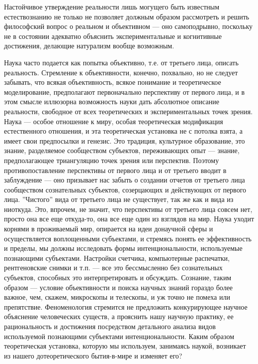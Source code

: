 \documentclass[11pt]{book}
\begin{document}
Настойчивое утверждение реальности лишь могущего быть известным естествознанию не только не позволяет должным образом рассмотреть и решить философский вопрос о реальном и объективном --- оно самоподрывно, поскольку не в состоянии адекватно объяснить экспериментальные и когнитивные достижения, делающие натурализм вообще возможным.

Наука часто подается как попытка объективно, т.е. от третьего лица, описать реальность. Стремление к объективности, конечно, похвально, но не следует забывать, что всякая объективность, всякое понимание и теоретическое моделирование, предполагают первоначально перспективу от первого лица, и в этом смысле иллюзорна возможность науки дать абсолютное описание реальности, свободное от всех теоретических и экспериментальных точек зрения. Наука --- особое отношение к миру, особая теоретическая модификация естественного отношения, и эта теоретическая установка не с потолка взята, а имеет свои предпосылки и генезис. Это традиция, культурное образование, это знание, разделяемое сообществом субъектов, переживающих опыт --- знание, предполагающее триангуляцию точек зрения или перспектив. Поэтому противопоставление перспективы от первого лица и от третьего вводит в заблуждение --- оно призывает нас забыть о создании отчетов от третьего лица сообществом сознательных субъектов, созерцающих и действующих от первого лица. ''Чистого'' вида от третьего лица не существует, так же как и вида из ниоткуда. Это, впрочем, не значит, что перспективы от третьего лица совсем нет, просто она все еще откуда-то, она все еще один из взглядов на мир. Наука уходит корнями в проживаемый мир, опирается на идеи донаучной сферы и осуществляется воплощенными субъектами, и стремясь понять ее эффективность и пределы, мы должны исследовать формы интенциональности, используемые познающими субъектами. Настройки счетчика, компьютерные распечатки, рентгеновские снимки и т.п. --- все это бессмысленно без сознательных субъектов, способных это интерпретировать и обсуждать. Сознание, таким образом --- условие объективности и поиска научных знаний гораздо более важное, чем, скажем, микроскопы и телескопы, и уж точно не помеха или препятствие. Феноменология стремится не предложить конкурирующее научное объяснение человеческих существ, а прояснить нашу научную практику, ее рациональность и достижения посредством детального анализа видов используемой познающими субъектами интенциональности. Каким образом теоретическая установка, которую мы используем, занимаясь наукой, возникает из нашего дотеоретического бытия-в-мире и изменяет его?
\end{document}
